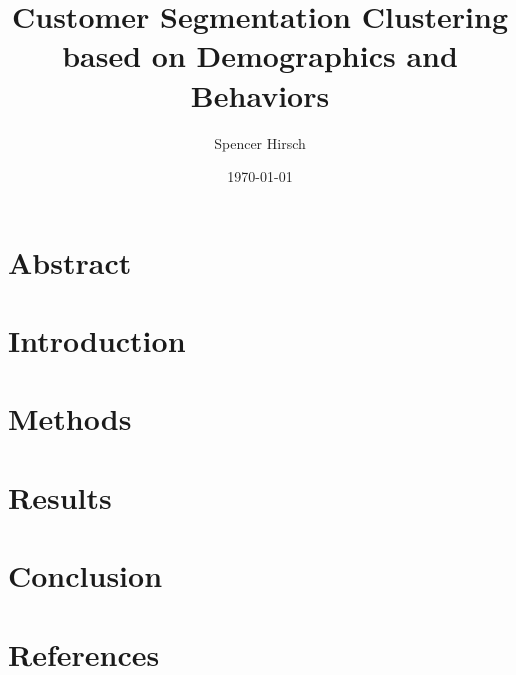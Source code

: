 \documentclass{article}
\title{Customer Segmentation Clustering based on Demographics and Behaviors}
\author{Spencer Hirsch}
\date{\today}
\begin{document}
\maketitle



\begin{multicols}{2}
\section{Abstract}
\section{Introduction}
\section{Methods}
\section{Results}
\section{Conclusion}
\end{multicols}

\section{References}
\end{document}
